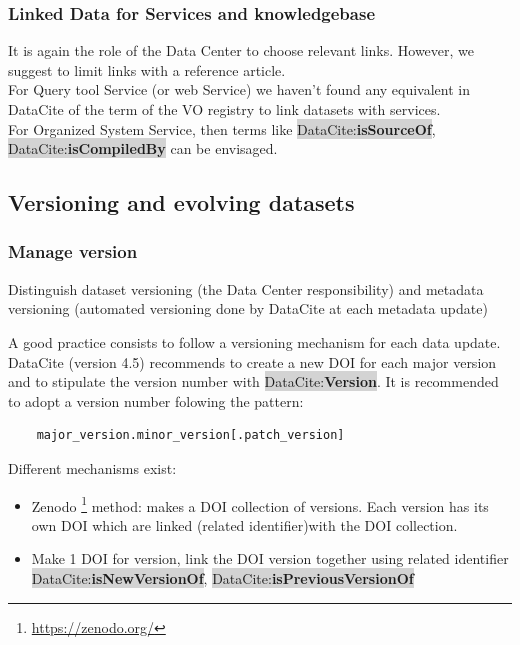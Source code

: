 \documentclass[11pt,a4paper]{ivoa}
\newcommand{\dataciteterm}[1]{\colorbox{lightgray}{DataCite:\textbf{#1}}}
\begin{document}
\subsubsection{Linked Data for Services and knowledgebase}
\label{sec:linkedataServiceKnowledgebase}
It is again the role of the Data Center to choose relevant links. However, we suggest to limit links with a reference article.\\

For Query tool Service (or web Service) we haven't found any equivalent in DataCite of the  term of the VO registry to link datasets with services. \\

For Organized System Service, then terms like \dataciteterm{isSourceOf}, \dataciteterm{isCompiledBy} can be envisaged.



\subsection{Versioning and evolving datasets}
\label{sec:version}

\subsubsection{Manage version}
Distinguish dataset versioning (the Data Center responsibility) and metadata versioning (automated versioning done by DataCite at each metadata update)

A good practice consists to follow a versioning mechanism for each data update. DataCite (version 4.5) recommends to create a new DOI for each major version and to stipulate the version number with \dataciteterm{Version}. 
It is recommended to adopt a version number folowing the pattern:
\begin{verbatim}
	major_version.minor_version[.patch_version]
\end{verbatim}


Different mechanisms exist:
\begin{itemize}
\item Zenodo \footnote{\url{https://zenodo.org/}} method: makes a DOI collection of versions. Each version has its own DOI which are linked (related identifier)with the DOI collection.
\item Make 1 DOI for version, link the DOI version together using related identifier \dataciteterm{isNewVersionOf}, \dataciteterm{isPreviousVersionOf}
\end{itemize}
\end{document}
